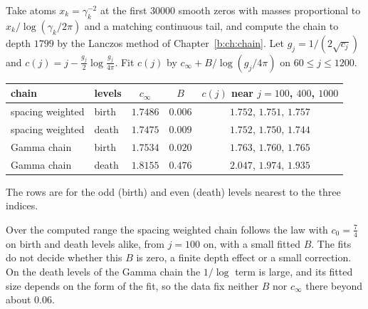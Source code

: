 \begin{remark}\label{l:comp:weighted}
Take atoms $x_k=\gamma_k^{-2}$ at the first $30000$ smooth zeros with masses proportional to $x_k/\log(\gamma_k/2\pi)$ and a matching continuous tail, and compute the chain to depth $1799$ by the Lanczos method of Chapter~\ref{b:ch:chain}. Let $g_j=1/(2\sqrt{c_j})$ and $c(j)=j-\frac{g_j}2\log\frac{g_j}{4\pi}$. Fit $c(j)$ by $c_\infty+B/\log(g_j/4\pi)$ on $60\le j\le1200$. %
\begin{center}\small
\begin{tabular}{@{}llccc@{}}
\toprule
chain & levels & $c_\infty$ & $B$ & $c(j)$ near $j=100$, $400$, $1000$\\
\midrule
spacing weighted & birth & $1.7486$ & $0.006$ & $1.752$, $1.751$, $1.757$\\
spacing weighted & death & $1.7475$ & $0.009$ & $1.752$, $1.750$, $1.744$\\
Gamma chain & birth & $1.7534$ & $0.020$ & $1.763$, $1.760$, $1.765$\\
Gamma chain & death & $1.8155$ & $0.476$ & $2.047$, $1.974$, $1.935$\\
\bottomrule
\end{tabular}
\end{center}
The rows are for the odd (birth) and even (death) levels nearest to the three indices.
\end{remark}

Over the computed range the spacing weighted chain follows the law with $c_0=\frac74$ on birth and death levels alike, from $j=100$ on, with a small fitted $B$. The fits do not decide whether this $B$ is zero, a finite depth effect or a small correction. On the death levels of the Gamma chain the $1/\log$ term is large, and its fitted size depends on the form of the fit, so the data fix neither $B$ nor $c_\infty$ there beyond about $0.06$.

